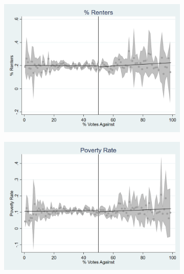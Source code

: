 \begin{figure}[ht]
    \centering
    \begin{minipage}[b]{0.48\textwidth}
        \centering
        \begin{subfigure}[b]{\textwidth}
            \centering
            \includegraphics[width=\textwidth,keepaspectratio]{images/cov_smoothness_pctrent.png}
            \label{fig:pctrent_sm}
        \end{subfigure}
    \end{minipage}
    \hfill
    \begin{minipage}[b]{0.48\textwidth}
        \centering
        \begin{subfigure}[b]{\textwidth}
            \centering
            \includegraphics[width=\textwidth,keepaspectratio]{images/cov_smoothness_poverty.png}
            \label{fig:poverty_sm}
        \end{subfigure}
    \end{minipage}


\end{figure}
